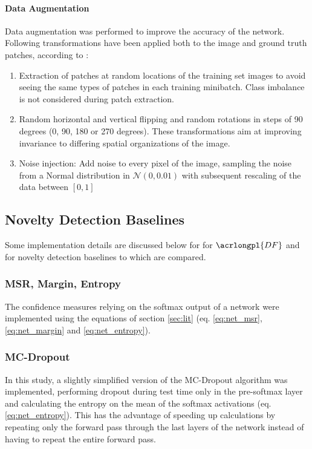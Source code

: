 \documentclass[10pt]{article}
\begin{document}
\paragraph{Data Augmentation} Data augmentation was performed to improve the accuracy of the network. Following transformations have been applied both to the image and ground truth patches, according to \textcite{Volpi2017DenseSL}:
\begin{enumerate}
    \item Extraction of patches at random locations of the training set images to avoid seeing the same types of patches in each training minibatch. Class imbalance is not considered during patch extraction.
    \item Random horizontal and vertical flipping and random rotations in steps of 90 degrees (0, 90, 180 or 270 degrees). These transformations aim at improving invariance to differing spatial organizations of the image.
    \item Noise injection: Add noise to every pixel of the image, sampling the noise from a Normal distribution in $\mathcal{N}(0, 0.01)$ with subsequent rescaling of the data between $[0, 1]$
\end{enumerate}

\subsection{Novelty Detection Baselines}
Some implementation details are discussed below for for $\acrlongpl{DF}$ and for novelty detection baselines to which  are compared. 

\subsubsection{MSR, Margin, Entropy} 
The confidence measures relying on the softmax output of a network were implemented using the equations of section \ref{sec:lit} (eq. \ref{eq:net_msr}, \ref{eq:net_margin} and \ref{eq:net_entropy}).

\subsubsection{MC-Dropout} 
In this study, a slightly simplified version of the \gls{MC-Dropout} algorithm was implemented, performing dropout during test time only in the pre-softmax layer and calculating the entropy on the mean of the softmax activations (eq. \ref{eq:net_entropy}). This has the advantage of speeding up calculations by repeating only the forward pass through the last layers of the network instead of having to repeat the entire forward pass.
\end{document}
